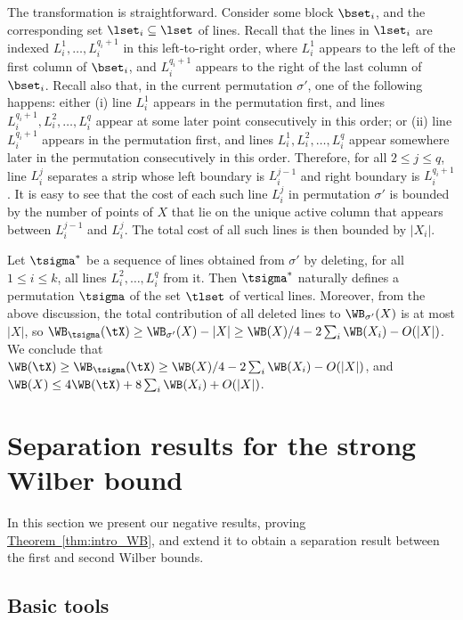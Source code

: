 \documentclass[11pt]{article}
\numberwithin{equation}{section}
\theoremstyle{definition}
\theoremstyle{plain}
\newcommand{\expref}[2]{\hyperref[#2]{#1~\ref{#2}}}
\begin{document}
The transformation is straightforward. Consider some block $\bset_i$, and the corresponding set $\lset_i\subseteq \lset$ of lines.
Recall that the lines in $\lset_i$ are indexed $L^1_i,\ldots,L^{q_i+1}_i$ in this left-to-right order, where $L^1_i$ appears to the left of the first column of $\bset_i$, and $L^{q_i+1}_i$ appears to the right of the last column of $\bset_i$. Recall also that, in the current permutation $\sigma'$, one of the following happens: either (i) line $L^1_i$ appears in the permutation first, and lines $L^{q_i+1}_i,L^2_i,\ldots, L^q_i$ appear at some later point consecutively in this order; or (ii) line $L^{q_i+1}_i$ appears in the permutation first, and lines $L^1_i,L^2_i,\ldots,L^q_i$ appear somewhere later in the permutation consecutively in this order. Therefore, for all $2\leq j\leq q$, line $L_i^j$ separates a strip whose left boundary is $L_i^{j-1}$ and right boundary is $L_i^{q_i+1}$. It is easy to see that the cost of each such line $L_i^j$ in permutation $\sigma'$ is bounded by the number of points of $X$ that lie on the unique active column that appears between $L_i^{j-1}$ and $L_i^j$. The total cost of all such lines is then bounded by $|X_i|$.

Let $\tsigma^*$ be a sequence of lines obtained from $\sigma'$ by deleting, for all $1\leq i\leq k$, all lines $L_i^2,\ldots,L_i^q$ from it. Then $\tsigma^*$ naturally defines a permutation $\tsigma$ of the set $\tlset$ of vertical lines. Moreover, from the above discussion, the total contribution of all deleted lines to $\WB_{\sigma'}(X)$ is at most $|X|$, so $\WB_{\tsigma}(\tX)\geq \WB_{\sigma'}(X)-|X|\geq \WB(X)/4-2\sum_i\WB(X_i)-O(|X|)$. We conclude that $\WB(\tX)\geq \WB_{\tsigma}(\tX)\geq \WB(X)/4-2\sum_i\WB(X_i)-O(|X|)$, and $\WB(X)\leq 4\WB(\tX)+8\sum_i\WB(X_i)+O(|X|)$.


%


\section{Separation results for the strong Wilber bound}
\label{sec: negative}

In this section we present our negative results,  proving \expref{Theorem}{thm:intro_WB}, and extend it to obtain a separation result between the first and second Wilber bounds. 

%
%
%
%
%
%
%
%
%
%
%
%
%
%
%
%
%




\subsection{Basic tools}
\label{sec: sequences} 
\end{document}
